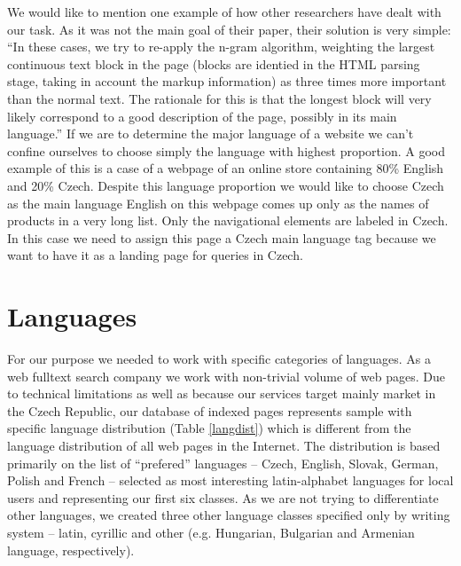 \documentclass{acm_proc_article-sp}
\begin{document}
  
  We would like to mention one example of how other researchers have dealt with our task. As it was not the main goal of 
  their paper, their solution is very simple:
  “In these cases, we try to re-apply the n-gram algorithm, weighting the largest continuous text block in the page 
  (blocks are identied in the HTML parsing stage, taking in account the markup information) as three times more important 
  than the normal text. The rationale for this is that the longest block will very likely correspond to a good description 
  of the page, possibly in its main language.” \cite{Martins:langidentweb} If we are to determine the major language of a website 
  we can’t confine ourselves to choose simply the language with highest proportion. A good example of this is a case of a webpage of an online store
  containing 80\% English and 20\% Czech. Despite this language proportion we would like to choose Czech as the main language
  English on this webpage comes up only as the names of products in a very long list. Only the navigational elements are labeled in Czech. In this case 
  we need to assign this page a Czech main language tag because we want to have it as a landing page for queries in Czech.

\section{Languages}

  For our purpose we needed to work with specific categories of languages.
  As a web fulltext search company we work with non-trivial volume of web pages.
  Due to technical limitations as well as because our services target mainly market in the Czech Republic,
  our database of indexed pages represents sample with specific language distribution (Table \ref{langdist}) which is different from the
  language distribution of all web pages in the Internet.
  The distribution is based primarily on the list of ``prefered'' languages –
  Czech, English, Slovak, German, Polish and French –
  selected as most interesting latin-alphabet languages for local users and representing  our first six classes.
  As we are not trying to differentiate other languages, we created three other language classes specified only by writing system
  – latin, cyrillic and other (e.g. Hungarian, Bulgarian and Armenian language, respectively).
\end{document}

